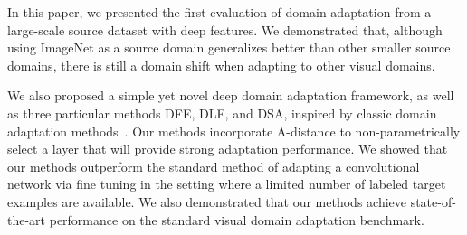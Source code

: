 In this paper, we presented the first evaluation of domain adaptation from a
large-scale source dataset with deep features. We demonstrated that, although
using ImageNet as a source domain generalizes better than other smaller source
domains, there is still a domain shift when adapting to other visual domains.

We also proposed a simple yet novel deep domain adaptation framework, as well as
three particular methods DFE, DLF, and DSA, inspired by classic domain
adaptation methods~\cite{daume, sa}. Our methods incorporate A-distance to
non-parametrically select a layer that will provide strong adaptation
performance. We showed that our methods outperform the standard method of
adapting a convolutional network via fine tuning in the setting where a limited
number of labeled target examples are available. We also demonstrated that our
methods achieve state-of-the-art performance on the standard visual domain
adaptation benchmark.

